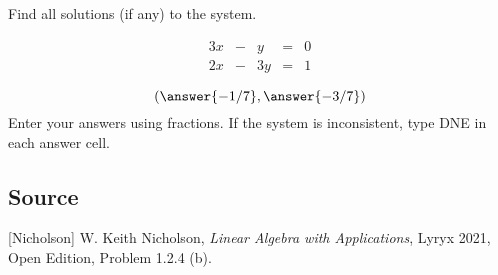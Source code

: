 \documentclass{ximera}
\author{}
\begin{document}
\begin{exercise}
Find all solutions (if any) to the system.  

$$\begin{matrix}
      3x& -&y&=&0\\
      2x & -&3y&= &1
    \end{matrix}$$

 $$(\answer{-1/7}, \answer{-3/7})$$
Enter your answers using fractions.  If the system is inconsistent, type DNE in each answer cell.
\end{exercise}

\subsection*{Source}
[Nicholson] W. Keith Nicholson, {\it Linear Algebra with Applications}, Lyryx 2021, Open Edition, Problem 1.2.4 (b).
\end{document}
